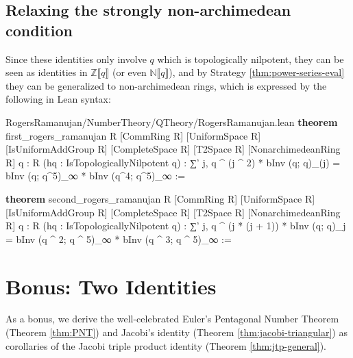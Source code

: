 \documentclass[12pt]{amsart}
\theoremstyle{definition}
\theoremstyle{remark}
\numberwithin{equation}{subsection}
\newcommand{\N}{\mathbb N}
\newcommand{\TBD}{{\color{red}TBD}}
\newcommand{\ps}[1]{\llbracket #1 \rrbracket} %
\newcommand{\Z}{\mathbb Z}
\newcommand{\kw}[1]{\textcolor{keywordcolor}{\textbf{#1}}}
\newcommand{\var}[1]{\textcolor{tacticcolor}{#1}}
\newcommand{\num}[1]{\textcolor{numcolor}{#1}}
\newcommand{\imp}[1]{\textcolor{commentcolor}{\textbraceleft#1\textbraceright}}
\begin{document}


\subsection{Relaxing the strongly non-archimedean condition}
\label{sec:relax}
Since these identities only involve $q$ which is topologically nilpotent, they can be seen as identities in $\Z\ps{q}$ (or even $\N\ps{q}$), and by Strategy \ref{thm:power-series-eval} they can be generalized to non-archimedean rings, which is expressed by the following in Lean syntax:

\begin{code}{RogersRamanujan/NumberTheory/QTheory/RogersRamanujan.lean}
\kw{theorem} first_rogers_ramanujan \imp{R} [CommRing \var{R}] [UniformSpace \var{R}]
  [IsUniformAddGroup \var{R}] [CompleteSpace \var{R}] [T2Space \var{R}] [NonarchimedeanRing \var{R}]
  \imp{q : R} (\var{hq} : IsTopologicallyNilpotent \var{q}) :
  ∑' \var{j}, \var{q} ^ (\var{j} ^ \num{2}) * bInv (\var{q}; \var{q})_(\var{j}) = bInv (\var{q}; \var{q}^\num{5})_∞ * bInv (\var{q}^\num{4}; \var{q}^\num{5})_∞ :=

\kw{theorem} second_rogers_ramanujan \imp{R} [CommRing \var{R}] [UniformSpace \var{R}]
  [IsUniformAddGroup \var{R}] [CompleteSpace \var{R}] [T2Space \var{R}] [NonarchimedeanRing \var{R}]
  \imp{q : R} (\var{hq} : IsTopologicallyNilpotent \var{q}) :
  ∑' \var{j}, \var{q} ^ (\var{j} * (\var{j} + \num{1})) * bInv (\var{q}; \var{q})_\var{j} = bInv (\var{q} ^ \num{2}; \var{q} ^ \num{5})_∞ * bInv (\var{q} ^ \num{3}; \var{q} ^ \num{5})_∞ :=
\end{code}


\section{Bonus: Two Identities}

As a bonus, we derive the well-celebrated Euler's Pentagonal Number Theorem (Theorem \ref{thm:PNT}) and Jacobi's identity (Theorem \ref{thm:jacobi-triangular}) as corollaries of the Jacobi triple product identity (Theorem \ref{thm:jtp-general}).
\end{document}
